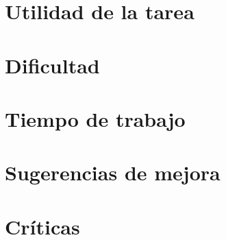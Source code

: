 \documentclass[a4paper]{report}
\begin{document}
	\section*{Utilidad de la tarea}
	
	\section*{Dificultad}
	
	\section*{Tiempo de trabajo}
	
	\section*{Sugerencias de mejora}
	
	\section*{Críticas}
\end{document}
